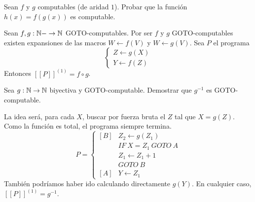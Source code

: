 \documentclass[twoside]{article}
\begin{document}
\newpage

\begin{ejercicio}{6}
Sean $f$ y $g$ computables (de aridad $1$). Probar que la función $h(x) = f(g(x))$ es
computable.
\end{ejercicio}
\begin{solucion}
Sean $f,g:\mathbb{N}-\to\mathbb{N}$ GOTO-computables. Por ser $f$ y $g$ GOTO-computables existen expansiones de las macros $W\leftarrow f(V)$ y $W\leftarrow g(V)$. Sea $P$ el programa
\[
\begin{cases}
Z\leftarrow g(X)\\
Y\leftarrow f(Z)
\end{cases}
\]  
Entonces $[[P]]^{(1)}=f\circ g$. 
\end{solucion}

\newpage

\begin{ejercicio}{10}
Sea $g : \mathbb{N} \to \mathbb{N}$ biyectiva y GOTO-computable. Demostrar que $g^{-1}$ es GOTO-computable.
\end{ejercicio}
\begin{solucion}
La idea será, para cada $X$, buscar por fuerza bruta el $Z$ tal que $X=g(Z)$. Como la función es total, el programa siempre termina.
\[
P=\begin{cases}
[B] &Z_2\leftarrow g(Z_1)\\
&IF\ X=Z_1 \ GOTO\ A\\
&Z_1\leftarrow Z_1+1\\
&GOTO\ B\\
[A] & Y\leftarrow Z_1
\end{cases}
\]
También podríamos haber ido calculando directamente $g(Y)$. En cualquier caso, $[[P]]^{(1)}=g^{-1}$. 
\end{solucion}

\newpage
\end{document}
